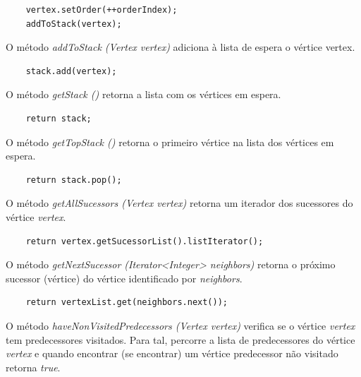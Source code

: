 \documentclass[a4paper,12pt]{report}
\begin{document}
\begin{lstlisting}
    vertex.setOrder(++orderIndex);
    addToStack(vertex);    
\end{lstlisting}

O método \textit{addToStack (Vertex vertex)} adiciona à lista de espera o vértice vertex.

\begin{lstlisting}  
    stack.add(vertex);
\end{lstlisting}    

O método \textit{getStack ()} retorna a lista com os vértices em espera.

\begin{lstlisting}
    return stack;
\end{lstlisting}

O método \textit{getTopStack ()} retorna o primeiro vértice na lista dos vértices em espera.

\begin{lstlisting}
    return stack.pop();
\end{lstlisting}

O método \textit{getAllSucessors (Vertex vertex)} retorna um iterador dos sucessores do vértice \textit{vertex}.

\begin{lstlisting}
    return vertex.getSucessorList().listIterator();
\end{lstlisting}

O método \textit{getNextSucessor (Iterator<Integer> neighbors)} retorna o próximo sucessor (vértice) do vértice identificado por \textit{neighbors}.

\begin{lstlisting}
    return vertexList.get(neighbors.next());    
\end{lstlisting}

O método \textit{haveNonVisitedPredecessors (Vertex vertex)} verifica se o vértice \textit{vertex} tem predecessores visitados. Para tal, percorre a lista de predecessores do vértice \textit{vertex} e quando encontrar (se encontrar) um vértice predecessor não visitado retorna \textit{true}.
\end{document}
